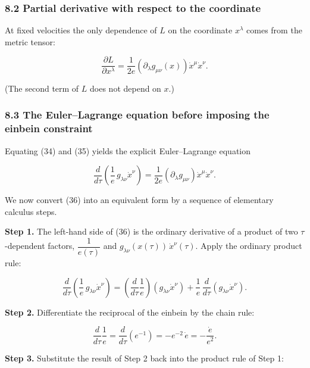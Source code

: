 \documentclass[
]{article}
\begin{document}
\hypertarget{partial-derivative-with-respect-to-the-coordinate}{%
\subsubsection{8.2 Partial derivative with respect to the
coordinate}\label{partial-derivative-with-respect-to-the-coordinate}}

At fixed velocities the only dependence of \(L\) on the coordinate
\(x^{\lambda}\) comes from the metric tensor:

\[\frac{\partial L}{\partial x^{\lambda}} = \frac{1}{2e} \left( \partial_{\lambda} g_{\mu\nu}(x) \right) \dot{x}^{\mu} \dot{x}^{\nu}. \tag{35}\]

(The second term of \(L\) does not depend on \(x\).)

\hypertarget{the-eulerlagrange-equation-before-imposing-the-einbein-constraint}{%
\subsubsection{8.3 The Euler--Lagrange equation before imposing the
einbein
constraint}\label{the-eulerlagrange-equation-before-imposing-the-einbein-constraint}}

Equating (34) and (35) yields the explicit Euler--Lagrange equation

\[\frac{d}{d\tau} \left( \frac{1}{e}\, g_{\lambda\nu} \dot{x}^{\nu} \right) = \frac{1}{2e} \left( \partial_{\lambda} g_{\mu\nu} \right) \dot{x}^{\mu} \dot{x}^{\nu}. \tag{36}\]

We now convert (36) into an equivalent form by a sequence of elementary
calculus steps.

\textbf{Step 1.} The left-hand side of (36) is the ordinary derivative
of a product of two \(\tau\)-dependent factors, \(\dfrac{1}{e(\tau)}\)
and \(g_{\lambda\nu}(x(\tau))\, \dot{x}^{\nu}(\tau)\). Apply the
ordinary product rule:

\[\frac{d}{d\tau} \left( \frac{1}{e}\, g_{\lambda\nu} \dot{x}^{\nu} \right) = \left( \frac{d}{d\tau} \frac{1}{e} \right) \left( g_{\lambda\nu} \dot{x}^{\nu} \right) + \frac{1}{e}\, \frac{d}{d\tau} \left( g_{\lambda\nu} \dot{x}^{\nu} \right). \tag{37}\]

\textbf{Step 2.} Differentiate the reciprocal of the einbein by the
chain rule:

\[\frac{d}{d\tau} \frac{1}{e} = \frac{d}{d\tau} \left( e^{-1} \right) = - e^{-2}\, \dot{e} = - \frac{\dot{e}}{e^{2}}. \tag{38}\]

\textbf{Step 3.} Substitute the result of Step 2 back into the product
rule of Step 1:
\end{document}
